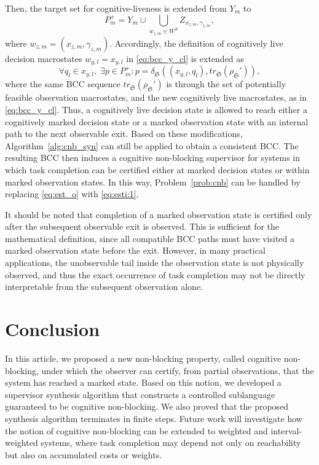 \documentclass[final,5p,times,twocolumn,authoryear]{elsarticle}
\begin{document}
Then, the target set for cognitive-liveness is extended from
$Y_m$ to
\begin{equation}
    P_m^{+}
    =
    Y_m \cup \bigcup_{w_{z,m} \in W^Z} Z_{x_{z,m}, \gamma_{z,m}},
    \label{eq:extended_target_set}
\end{equation}
where $w_{z,m} = (x_{z,m}, \gamma_{z,m})$.
Accordingly, the definition of cognitively live decision macrostates $w_{y, l} = x_{y,l}$ in \eqref{eq:bcc_y_cl} is extended as
\begin{equation}
\label{eq:bcc_y_cl:2}
    \forall q_l \in x_{y,l},\;
    \exists p \in P_m^{+} :
    p = \delta_{\mathfrak{S}}((x_{y,l}, q_l),tr_{\mathfrak{S}}(\rho_{\mathfrak{S}}')),
\end{equation}
where the same BCC sequence $tr_{\mathfrak{S}}(\rho_{\mathfrak{S}}')$ is through the set of potentially feasible observation macrostates, and the new cognitively live macrostates, as in \eqref{eq:bcc_y_cl}.
Thus, a cognitively live decision state is allowed to reach either a cognitively marked decision state or a marked observation state with an internal path to the next observable exit.
%
Based on these modifications, Algorithm~\ref{alg:cnb_syn} can still be applied to obtain a consistent BCC. 
The resulting BCC then induces a cognitive non-blocking supervisor for systems in which task completion can be certified either at marked decision states or within marked observation states.
In this way, Problem~\ref{prob:cnb} can be handled by replacing \eqref{eq:est_o} with \eqref{eq:esti:1}.

It should be noted that completion of a marked observation state is certified only after the subsequent observable exit is observed. 
This is sufficient for the mathematical definition, since all compatible BCC paths must have visited a marked observation state before the exit. 
However, in many practical applications, the unobservable tail inside the observation state is not physically observed, and thus the exact occurrence of task completion may not be directly interpretable from the subsequent observation alone.

\section{Conclusion}\label{sec:con}

In this article, we proposed a new non-blocking property, called cognitive non-blocking, under which the observer can certify, from partial observations, that the system has reached a marked state.
Based on this notion, we developed a supervisor synthesis algorithm that constructs a controlled sublanguage guaranteed to be cognitive non-blocking. 
We also proved that the proposed synthesis algorithm terminates in finite steps. 
%
Future work will investigate how the notion of cognitive non-blocking can be extended to weighted and interval-weighted systems, where task completion may depend not only on reachability but also on accumulated
costs or weights.




\end{document}
